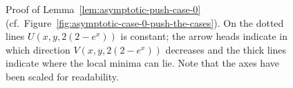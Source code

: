 \documentclass[a4paper]{amsart} %
\theoremstyle{definition}
\theoremstyle{remark}
\numberwithin{equation}{section}
\newcommand*{\XXXasymptoticDenominator}{V}
\newcommand*{\XXXasymptoticNominator}{U}
\begin{document}
\begin{figure}[b]
		\caption{%
			Proof of Lemma~\ref{lem:asymptotic-push-case-0} (cf.\ Figure~\ref{fig:asymptotic-case-0-push-the-cases}).
			On the dotted lines 
			$\XXXasymptoticNominator(x,y,2(2-e^x))$ is constant;
			the arrow heads indicate in which direction 
			$\XXXasymptoticDenominator(x,y,2(2-e^x))$ decreases
			and the thick lines indicate where the local minima  can lie.
			Note that the axes have been scaled for readability.	}
		\label{fig:asymptotic-case-0-push-proof}
	\end{figure}
	
	
	
\end{document}
